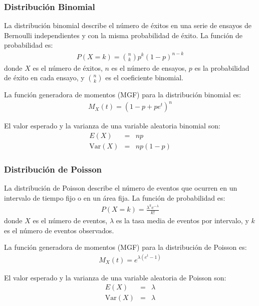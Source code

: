 \subsubsection{Distribuci\'on Binomial}

La distribuci\'on binomial describe el n\'umero de \'exitos en una serie de ensayos de Bernoulli independientes y con la misma probabilidad de \'exito. La funci\'on de probabilidad es:
\begin{eqnarray*}
P(X = k) = \binom{n}{k} p^k (1-p)^{n-k}
\end{eqnarray*}
donde $X$ es el n\'umero de \'exitos, $n$ es el n\'umero de ensayos, $p$ es la probabilidad de \'exito en cada ensayo, y $\binom{n}{k}$ es el coeficiente binomial.

La funci\'on generadora de momentos (MGF) para la distribuci\'on binomial es:
\begin{eqnarray*}
M_X(t) = \left( 1 - p + pe^t \right)^n
\end{eqnarray*}

El valor esperado y la varianza de una variable aleatoria binomial son:
\begin{eqnarray*}
E(X) &=& np \\
\text{Var}(X) &=& np(1-p)
\end{eqnarray*}

\subsubsection{Distribuci\'on de Poisson}

La distribuci\'on de Poisson describe el n\'umero de eventos que ocurren en un intervalo de tiempo fijo o en un \'area fija. La funci\'on de probabilidad es:
\begin{eqnarray*}
P(X = k) = \frac{\lambda^k e^{-\lambda}}{k!}
\end{eqnarray*}
donde $X$ es el n\'umero de eventos, $\lambda$ es la tasa media de eventos por intervalo, y $k$ es el n\'umero de eventos observados.

La funci\'on generadora de momentos (MGF) para la distribuci\'on de Poisson es:
\begin{eqnarray*}
M_X(t) = e^{\lambda (e^t - 1)}
\end{eqnarray*}

El valor esperado y la varianza de una variable aleatoria de Poisson son:
\begin{eqnarray*}
E(X) &=& \lambda \\
\text{Var}(X) &=& \lambda
\end{eqnarray*}

